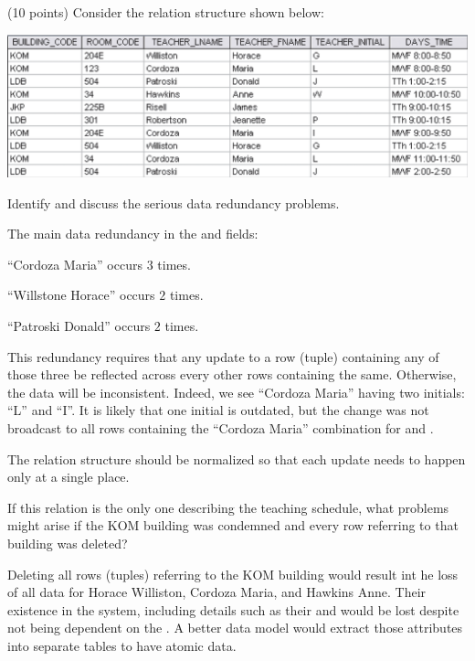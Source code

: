 

\begin{problem} (10 points)
  Consider the relation structure shown below:

  \bigskip

  \includegraphics[scale=0.8]{res/01.png}

  \begin{enumalph}
    \item Identify and discuss the serious data redundancy problems.
    \begin{Answer}
      The main data redundancy in the 
      and  fields:
      \begin{enumalph}
        \item ``Cordoza Maria'' occurs $3$ times.
        \item ``Willstone Horace'' occurs $2$ times.
        \item ``Patroski Donald'' occurs $2$ times.
      \end{enumalph}
	
      \bigskip
      This redundancy requires that any update to a row (tuple) containing
      any of those three be reflected across every other rows containing the same.
      Otherwise, the data will be inconsistent.
      Indeed, we see ``Cordoza Maria'' having two initials: ``L'' and ``I''.
      It is likely that one initial is outdated, but the change
      was not broadcast to all rows containing the ``Cordoza Maria'' combination
      for  and .

      The relation structure should be normalized so that
      each update needs to happen only at a single place.
    \end{Answer}
    \item  If this relation is the only one describing the teaching schedule,
    what problems might arise if the KOM building was condemned
    and every row referring to that building was deleted?
    \begin{Answer}

      Deleting all rows (tuples) referring to the KOM building
      would result int he loss of all data for
      Horace Williston, Cordoza Maria, and Hawkins Anne.
      Their existence in the system, including details such as their
       and  would be lost
      despite not being dependent on the .
      A better data model would extract those attributes into separate tables
      to have atomic data.
    \end{Answer}
  \end{enumalph}

\end{problem}
